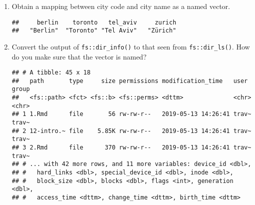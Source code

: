 \documentclass[]{book}
\newenvironment{Shaded}{\begin{snugshade}}{\end{snugshade}}
\newcommand{\CommentTok}[1]{\textcolor[rgb]{0.56,0.35,0.01}{\textit{#1}}}
\newcommand{\KeywordTok}[1]{\textcolor[rgb]{0.13,0.29,0.53}{\textbf{#1}}}
\newcommand{\NormalTok}[1]{#1}
\newcommand{\OperatorTok}[1]{\textcolor[rgb]{0.81,0.36,0.00}{\textbf{#1}}}
\newcommand{\StringTok}[1]{\textcolor[rgb]{0.31,0.60,0.02}{#1}}
\begin{document}
\begin{enumerate}
\def\labelenumi{\arabic{enumi}.}
\item
  Obtain a mapping between city code and city name as a named vector.

\begin{Shaded}
\end{Shaded}

\begin{verbatim}
##     berlin    toronto   tel_aviv     zurich 
##   "Berlin"  "Toronto" "Tel Aviv"   "Zürich"
\end{verbatim}
\item
  Convert the output of \texttt{fs::dir\_info()} to that seen from \texttt{fs::dir\_ls()}. How do you make sure that the vector is named?

\begin{Shaded}
\end{Shaded}

\begin{verbatim}
## # A tibble: 45 x 18
##   path       type     size permissions modification_time   user  group
##   <fs::path> <fct> <fs::b> <fs::perms> <dttm>              <chr> <chr>
## 1 1.Rmd      file       56 rw-rw-r--   2019-05-13 14:26:41 trav~ trav~
## 2 12-intro.~ file    5.85K rw-rw-r--   2019-05-13 14:26:41 trav~ trav~
## 3 2.Rmd      file      370 rw-rw-r--   2019-05-13 14:26:41 trav~ trav~
## # ... with 42 more rows, and 11 more variables: device_id <dbl>,
## #   hard_links <dbl>, special_device_id <dbl>, inode <dbl>,
## #   block_size <dbl>, blocks <dbl>, flags <int>, generation <dbl>,
## #   access_time <dttm>, change_time <dttm>, birth_time <dttm>
\end{verbatim}


\end{enumerate}
\end{document}
